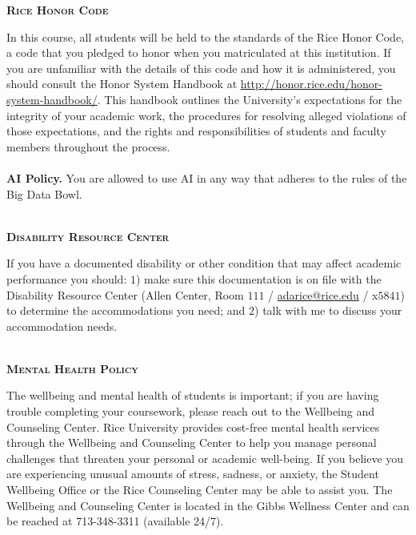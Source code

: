 \documentclass[11pt]{article}
\begin{document}
\textbf{\textsc{Rice Honor Code}}
\begin{adjustwidth}{1cm}{0cm}
  In this course, all students will be held to the standards of the Rice Honor Code, a code that you pledged to honor when you matriculated at this institution. If you are unfamiliar with the details of this code and how it is administered, you should consult the Honor System Handbook at \url{http://honor.rice.edu/honor-system-handbook/}. This handbook outlines the University's expectations for the integrity of your academic work, the procedures for resolving alleged violations of those expectations, and the rights and responsibilities of students and faculty members throughout the process.\\
  ~\\
  \textbf{AI Policy.} You are allowed to use AI in any way that adheres to the rules of the Big Data Bowl.
\end{adjustwidth}

~\\
\textbf{\textsc{Disability Resource Center}}
\begin{adjustwidth}{1cm}{0cm}
  If you have a documented disability or other condition that may affect academic performance you should: $1$) make sure this documentation is on file with the Disability Resource Center (Allen Center, Room $111$ / \href{mailto:adarice@rice.edu}{adarice@rice.edu} / x$5841$) to determine the accommodations you need; and $2$) talk with me to discuss your accommodation needs.
\end{adjustwidth}

~\\
\textbf{\textsc{Mental Health Policy}}
\begin{adjustwidth}{1cm}{0cm}
	The wellbeing and mental health of students is important; if you are having trouble completing your coursework, please reach out to the Wellbeing and Counseling Center. Rice University provides cost-free mental health services through the Wellbeing and Counseling Center to help you manage personal challenges that threaten your personal or academic well-being. If you believe you are experiencing unusual amounts of stress, sadness, or anxiety, the Student Wellbeing Office or the Rice Counseling Center may be able to assist you. The Wellbeing and Counseling Center is located in the Gibbs Wellness Center and can be reached at 713-348-3311 (available 24/7).
\end{adjustwidth}
\end{document}
